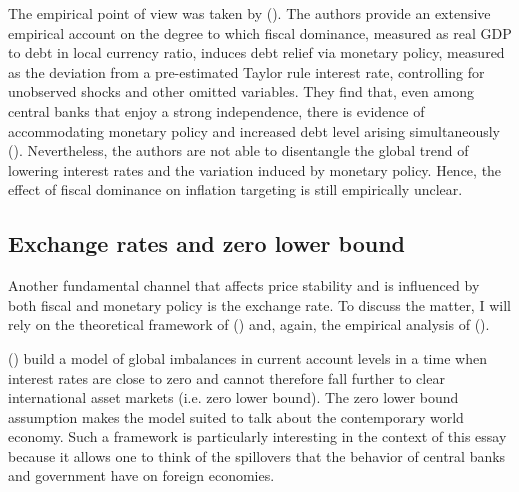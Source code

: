 \documentclass[american]{scrartcl}
\newcommand{\citein}[1]{\citeauthor{#1} (\citeyear{#1})}
\begin{document}
The empirical point of view was taken by \citein{Ahmed2021}. The authors provide an extensive empirical account on the degree to which fiscal dominance, measured as real GDP to debt in local currency ratio, induces debt relief via monetary policy, measured as the deviation from a pre-estimated Taylor rule interest rate, controlling for unobserved shocks and other omitted variables. They find that, even among central banks that enjoy a strong independence, there is evidence of accommodating monetary policy and increased debt level arising simultaneously (\cite[p. 19]{Ahmed2021}). Nevertheless, the authors are not able to disentangle the global trend of lowering interest rates and the variation induced by monetary policy. Hence, the effect of fiscal dominance on inflation targeting is still empirically unclear.

\subsection{Exchange rates and zero lower bound} \label{caballero}

Another fundamental channel that affects price stability and is influenced by both fiscal and monetary policy is the exchange rate. To discuss the matter, I will rely on the theoretical framework of \citein{Caballero2016} and, again, the empirical analysis of \citein{Ahmed2021}.

\citein{Caballero2016} build a model of global imbalances in current account levels in a time when interest rates are close to zero and cannot therefore fall further to clear international asset markets (i.e. zero lower bound). The zero lower bound assumption makes the model suited to talk about the contemporary world economy. Such a framework is particularly interesting in the context of this essay because it allows one to think of the spillovers that the behavior of central banks and government have on foreign economies.
\end{document}
